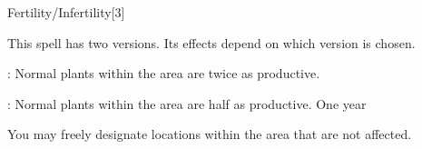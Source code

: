 \begin{spellsection}{Fertility/Infertility}[3]
    \begin{spellheader}
    \end{spellheader}
    \begin{spellcontent}
        \begin{spelltargetinginfo}
        \end{spelltargetinginfo}
        \begin{spelleffects}
            \spellspecial This spell has two versions. Its effects depend on which version is chosen.
            \par {}: Normal plants within the area are twice as productive.
            \par {}: Normal plants within the area are half as productive.
            \spelldur One year
        \end{spelleffects}
    \end{spellcontent}
    \begin{spellfooter}
        \spellnotes You may freely designate locations within the area that are not affected.
    \end{spellfooter}
    \begin{spellaugments}
    \end{spellaugments}
\end{spellsection}

